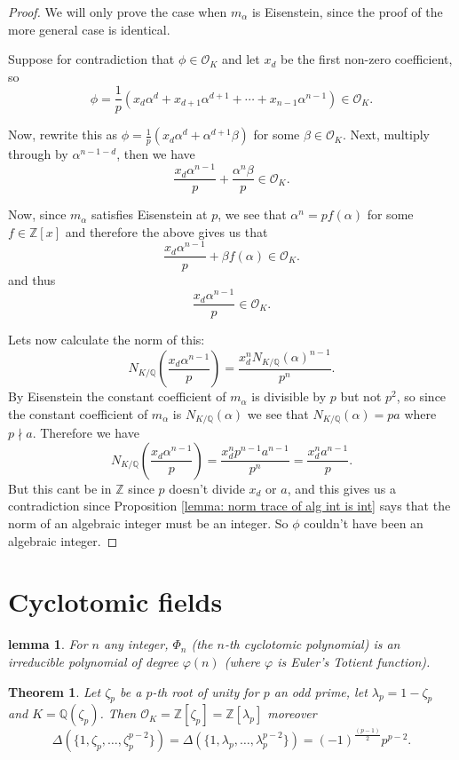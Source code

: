 \documentclass[11pt,a4paper]{amsart}
\theoremstyle{plain}
\newtheorem{theorem}[subsection]{Theorem}
\newtheorem{lemma}[subsection]{lemma}
\theoremstyle{definition}
\theoremstyle{definition}
\newcommand{\ZZ}{\mathbb{Z}}
\def\QQ{\mathbb{Q}}
\def \a{\alpha}
\def \lam {\lambda}
\def \OO {\mathcal{O}}
\begin{document}
	
	\begin{proof}
		We will only prove the case when $m_\a$ is Eisenstein, since the proof of the more general case is identical.	
		
		Suppose for contradiction that $\phi \in \OO_K$ and let $x_d$ be the first non-zero coefficient, so \[\phi=\frac{1}{p}(x_d\a^d+x_{d+1}\a^{d+1}+\cdots+x_{n-1}\a^{n-1}) \in \OO_K.\]
		
		Now, rewrite this as $\phi=\frac{1}{p}(x_d\a^d +\a^{d+1}\beta)$ for some $\beta \in \OO_K$. Next, multiply through by $\a^{n-1-d}$, then we have \[\frac{x_d\a^{n-1}}{p}+\frac{\a^n\beta}{p} \in \OO_K.\]
		
		Now, since  $m_\a$ satisfies Eisenstein at $p$, we see that $\a^n=pf(\a)$ for some $f \in \ZZ[x]$ and therefore the above gives us that \[\frac{x_d\a^{n-1}}{p}+\beta f(\a) \in \OO_K.\] and thus \[\frac{x_d\a^{n-1}}{p} \in \OO_K.\]
		
		Lets now calculate the norm of this: \[N_{K/\QQ} \left(\frac{x_d\a^{n-1}}{p} \right)=\frac{x_d^n N_{K/\QQ}(\a)^{n-1}}{p^n}.\] By Eisenstein the constant coefficient of $m_\a$ is divisible by $p$ but not $p^2$, so since the constant coefficient of $m_\a$ is $N_{K/\QQ}(\a)$ we see that $N_{K/\QQ}(\a)=p a$ where $p \nmid a$. Therefore we have \[N_{K/\QQ} \left(\frac{x_d\a^{n-1}}{p} \right)=\frac{x_d^n p^{n-1}a^{n-1}}{p^n}= \frac{x_d^n a^{n-1}}{p}.\] But this cant be in $\ZZ$ since $p$ doesn't divide $x_d$ or $a$, and this gives us a contradiction since  Proposition \ref{lemma: norm trace of alg int is int} says that the norm of an algebraic integer must be an integer. So $\phi$ couldn't have been an algebraic integer. 
		
		
	\end{proof}	
	
	\section{Cyclotomic fields}
	
	
	\begin{lemma}\label{lemma: cyclo poly}
		For $n$ any integer, $\Phi_n$ (the $n$-th cyclotomic polynomial) is an irreducible polynomial of degree $\varphi(n)$ (where $\varphi$ is Euler's Totient function).
	\end{lemma}
	
	
	
	
	\begin{theorem}\label{theorem: ring of ints of cyclo}
		Let $\zeta_p$ be a $p$-th root of unity for $p$ an odd prime, let $\lam_p=1-\zeta_p$ and $K=\QQ(\zeta_p)$. Then $\OO_K=\ZZ[\zeta_p]=\ZZ[\lam_p]$ moreover \[\Delta(\{1,\zeta_p,\dots,\zeta_p^{p-2}\})=\Delta(\{1,\lam_p,\dots,\lam_p^{p-2}\})=(-1)^{\frac{(p-1)}{2}}p^{p-2}.\]
	\end{theorem}	
	
\end{document}
